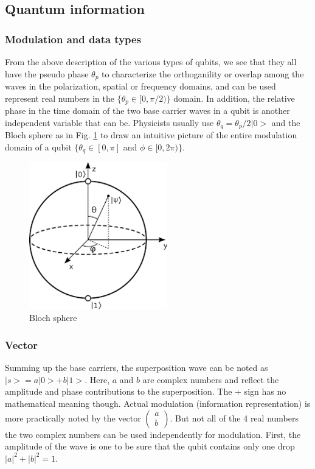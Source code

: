 \documentclass{book}
\begin{document}
\subsection{Quantum information}
\subsubsection{Modulation and data types}
From the above description of the various types of qubits, we see that they all have the pseudo phase $\theta_p$ to characterize the 
orthoganility or overlap among the waves in the polarization, spatial or frequency domains, and can be used represent real numbers in the $\{\theta_p \in [0, \pi/2)\}$ domain. In addition, the relative phase in the time domain of the two base carrier waves in a qubit is another independent variable that can be. Physicists usually use $\theta_q = \theta_p/2 |0>$ and the Bloch sphere as in Fig. \ref{Bloch} to draw an intuitive picture of the entire modulation domain of a qubit $\{\theta_q \in [0, \pi]$ and $\phi \in [0, 2\pi)\}$.

\begin{figure}[ht]
\includegraphics[width=6cm]{pic/blochSphere.png}
\caption{Bloch sphere}
\label{Bloch}
\end{figure}

\subsubsection{Vector}
Summing up the base carriers, the superposition wave can be noted as $|s> = a |0> + b |1>$. Here, $a$ and $b$ are complex numbers and reflect the amplitude and phase contributions to the superposition. The $+$ sign has no mathematical meaning though. Actual modulation (information representation) is more practically noted by the vector $
\begin{pmatrix}
    a \\
    b
\end{pmatrix}.$
But not all of the 4 real numbers the two complex numbers can be used independently for modulation. First, the amplitude of the wave is one to be sure that the qubit contains only one drop $|a|^2 + |b|^2 = 1$. 
 
\end{document}
